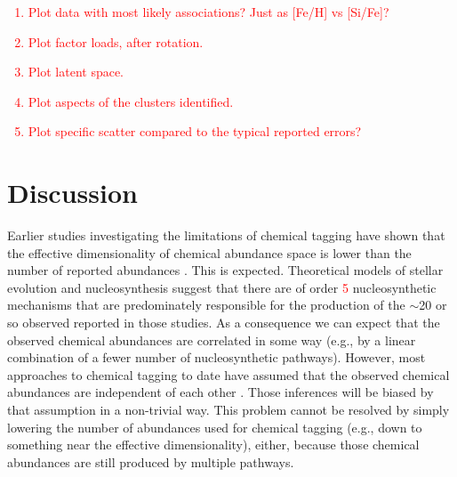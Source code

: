 \documentclass[twocolumn]{aastex62}
\newcommand{\todo}[1]{\textcolor{red}{#1}}
\begin{document}
\todo{
\begin{enumerate}
	\item Plot data with most likely associations? Just as [Fe/H] vs [Si/Fe]?
	\item Plot factor loads, after rotation.
	\item Plot latent space.
	\item Plot aspects of the clusters identified.
	\item Plot specific scatter compared to the typical reported errors?
\end{enumerate}
}



\section{Discussion} \label{sec:discussion}



Earlier studies investigating the limitations of chemical tagging have shown
that the effective dimensionality of chemical abundance space is lower than
the number of reported abundances \citep[e.g. about 8,][]{Ting:2008}. 
This is expected. Theoretical models of stellar evolution and nucleosynthesis 
suggest that there are of order \todo{5} nucleosynthetic mechanisms that are
predominately responsible for the production of the $\sim$20 or so observed 
reported in those studies. As a consequence we can expect that the observed
chemical abundances are correlated in some way (e.g., by a linear combination
of a fewer number of nucleosynthetic pathways).  However, most approaches to
chemical tagging to date have assumed that the observed chemical abundances
are independent of each other \todo{\citep[e.g.,][]{who}}. Those inferences
will be biased by that assumption in a non-trivial way. This problem cannot be
resolved by simply lowering the number of abundances used for chemical tagging (e.g.,
down to something near the effective dimensionality), either, because those
chemical abundances are still produced by multiple pathways.
\end{document}
